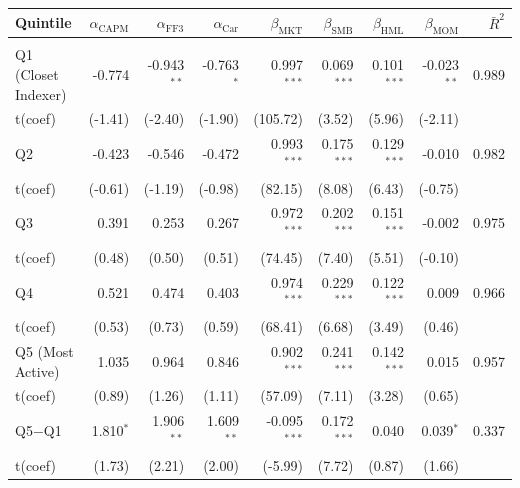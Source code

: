 \begin{table}[!htbp]
{\tablefont
\setlength{\tabcolsep}{2pt}%
\begin{tabular*}{\linewidth}{@{\extracolsep{\fill}}lrrrrrrrr}
\toprule
Quintile & $\alpha_{\text{CAPM}}$ & $\alpha_{\text{FF3}}$ & $\alpha_{\text{Car}}$ & $\beta_{\text{MKT}}$ & $\beta_{\text{SMB}}$ & $\beta_{\text{HML}}$ & $\beta_{\text{MOM}}$ & $\bar{R}^2$\\
\midrule
\addlinespace[0.3em]
\multicolumn{9}{l}{Panel A: Active --- EW Gross}\\
\hspace{1em}Q1 (Closet Indexer) & -0.774 & -0.943$^{**}$ & -0.763$^{*}$ & 0.997$^{***}$ & 0.069$^{***}$ & 0.101$^{***}$ & -0.023$^{**}$ & 0.989\\
\hspace{1em}t(coef) & (-1.41) & (-2.40) & (-1.90) & (105.72) & (3.52) & (5.96) & (-2.11) & \\
\hspace{1em}Q2 & -0.423 & -0.546 & -0.472 & 0.993$^{***}$ & 0.175$^{***}$ & 0.129$^{***}$ & -0.010 & 0.982\\
\hspace{1em}t(coef) & (-0.61) & (-1.19) & (-0.98) & (82.15) & (8.08) & (6.43) & (-0.75) & \\
\hspace{1em}Q3 & 0.391 & 0.253 & 0.267 & 0.972$^{***}$ & 0.202$^{***}$ & 0.151$^{***}$ & -0.002 & 0.975\\
\hspace{1em}t(coef) & (0.48) & (0.50) & (0.51) & (74.45) & (7.40) & (5.51) & (-0.10) & \\
\hspace{1em}Q4 & 0.521 & 0.474 & 0.403 & 0.974$^{***}$ & 0.229$^{***}$ & 0.122$^{***}$ & 0.009 & 0.966\\
\hspace{1em}t(coef) & (0.53) & (0.73) & (0.59) & (68.41) & (6.68) & (3.49) & (0.46) & \\
\hspace{1em}Q5 (Most Active) & 1.035 & 0.964 & 0.846 & 0.902$^{***}$ & 0.241$^{***}$ & 0.142$^{***}$ & 0.015 & 0.957\\
\hspace{1em}t(coef) & (0.89) & (1.26) & (1.11) & (57.09) & (7.11) & (3.28) & (0.65) & \\
\hspace{1em}Q5$-$Q1 & 1.810$^{*}$ & 1.906$^{**}$ & 1.609$^{**}$ & -0.095$^{***}$ & 0.172$^{***}$ & 0.040 & 0.039$^{*}$ & 0.337\\
\hspace{1em}t(coef) & (1.73) & (2.21) & (2.00) & (-5.99) & (7.72) & (0.87) & (1.66) & \\

\end{tabular*}}
\end{table}

